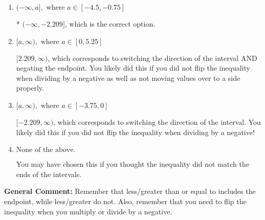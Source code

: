 \documentclass{extbook}[14pt]
\begin{document}
\begin{enumerate}
{\begin{enumerate}[label=\Alph*.]
 $(-\infty, 2.209]$, which corresponds to negating the endpoint of the solution.
\item \( (-\infty, a], \text{ where } a \in [-4.5, -0.75] \)

* $(-\infty, -2.209]$, which is the correct option.
\item \( [a, \infty), \text{ where } a \in [0, 5.25] \)

 $[2.209, \infty)$, which corresponds to switching the direction of the interval AND negating the endpoint. You likely did this if you did not flip the inequality when dividing by a negative as well as not moving values over to a side properly.
\item \( [a, \infty), \text{ where } a \in [-3.75, 0] \)

 $[-2.209, \infty)$, which corresponds to switching the direction of the interval. You likely did this if you did not flip the inequality when dividing by a negative!
\item \( \text{None of the above}. \)

You may have chosen this if you thought the inequality did not match the ends of the intervals.
\end{enumerate}

\textbf{General Comment:} Remember that less/greater than or equal to includes the endpoint, while less/greater do not. Also, remember that you need to flip the inequality when you multiply or divide by a negative.
}
\end{enumerate}
\end{document}
